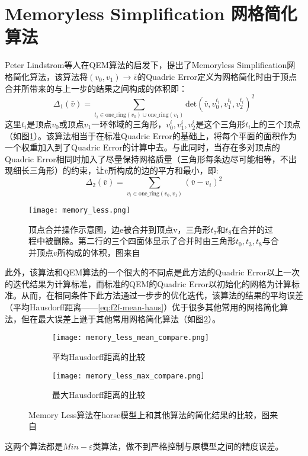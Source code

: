 \section{Memoryless Simplification 网格简化算法}
Peter Lindstrom等人在QEM算法的启发下，提出了Memoryless Simplification网格简化算法\cite{memory-less}，该算法将$(v_0,v_1) \to \bar{v}$的Quadric Error定义为网格简化时由于顶点合并所带来的与上一步的结果之间构成的体积即：
\begin{equation}
  \Delta_1(\bar{v}) = \sum_{t_i \in \text{one\_ring}(v_0) \cup \text{one\_ring}(v_1)} \text{det} (\bar{v},v_0^{t_i},v_1^{t_i},v_2^{t_i})^2
\end{equation}
这里$t_i$是顶点$v_0$或顶点$v_1$一环邻域的三角形，$v_0^i,v_1^i, v_2^i$是这个三角形$t_i$上的三个顶点（如图\ref{fig:memory-less}）。该算法相当于在标准Quadric Error的基础上，将每个平面的面积作为一个权重加入到了Quadric Error的计算中去。与此同时，当存在多对顶点的Quadric Error相同时加入了尽量保持网格质量（三角形每条边尽可能相等，不出现细长三角形）的约束，让$\bar{v}$所构成的边的平方和最小，即:
\begin{equation}
  \Delta_2(\bar{v}) = \sum_{v_i \in \text{one\_ring} (v_0,v_1)} (\bar{v}-v_i)^2
\end{equation}
\begin{figure}[htbp]
    \centering
    \texttt{[image: memory\_less.png]}
    \caption[顶点合并操作]{顶点合并操作示意图，边e被合并到顶点v，三角形$t_7$和$t_8$在合并的过程中被删除。第二行的三个四面体显示了合并时由三角形$t_0,t_3,t_8$与合并顶点$v$所构成的体积，图来自\cite{memory-less}}
    \label{fig:memory-less}
\end{figure}
此外，该算法和QEM算法的一个很大的不同点是此方法的Quadric Error以上一次的迭代结果为计算标准，而标准的QEM的Quadric Error以初始化的网格为计算标准。从而，在相同条件下此方法通过一步步的优化迭代，该算法的结果的平均误差（平均Hausdorff距离——\ref{eq:f2f-mean-haus}）优于很多其他常用的网格简化算法，但在最大误差上逊于其他常用网格简化算法（如图\ref{fig:memory-less-compare}）。
\begin{figure}[htbp]
  \centering
  \begin{subfigure}[b]{0.7\textwidth}
    \texttt{[image: memory\_less\_mean\_compare.png]}
    \caption[input]{平均Hausdorff距离的比较}
    \end{subfigure}
    \begin{subfigure}[b]{0.7\textwidth}
      \texttt{[image: memory\_less\_max\_compare.png]}
      \caption[mls]{最大Hausdorff距离的比较}
    \end{subfigure}
    \caption[Memory Less简化结果]{Memory Less算法在horse模型上和其他算法的简化结果的比较，图来自\cite{memory-less}}
    \label{fig:memory-less-compare}
\end{figure}
这两个算法都是$Min-\varepsilon$类算法，做不到严格控制与原模型之间的精度误差。

